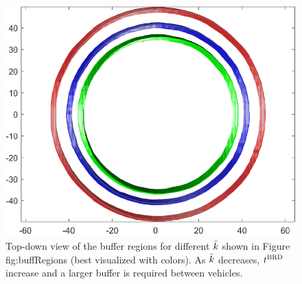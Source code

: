 \begin{figure}[H]
  \centering
  \includegraphics[width=0.8\columnwidth]{"figs/bufferRegions_topdown"}
  \caption{Top-down view of the buffer regions for different $\bar{k}$ shown in Figure {fig:buffRegions} (best visualized with colors). As $\bar{k}$ decreases, $t^\text{BRD}$ increase and a larger buffer is required between vehicles.}
  \label{fig:buffRegions_td}
\end{figure}

